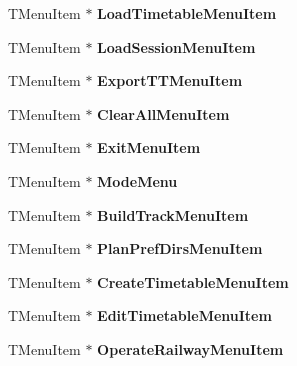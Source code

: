 \begin{DoxyCompactItemize}
T\+Menu\+Item $\ast$ {\bfseries Load\+Timetable\+Menu\+Item}
\item 
\mbox{\label{class_t_interface_aa62edd983f6ff1f2d0d68f48c6aaeda0}} 
T\+Menu\+Item $\ast$ {\bfseries Load\+Session\+Menu\+Item}
\item 
\mbox{\label{class_t_interface_a81b00a53a2e0591baf3589bb4c5b3793}} 
T\+Menu\+Item $\ast$ {\bfseries Export\+T\+T\+Menu\+Item}
\item 
\mbox{\label{class_t_interface_afd79ba734c2b134f0279b72d6606db22}} 
T\+Menu\+Item $\ast$ {\bfseries Clear\+All\+Menu\+Item}
\item 
\mbox{\label{class_t_interface_a9e147ffa9214458e6ea4838748da9a63}} 
T\+Menu\+Item $\ast$ {\bfseries Exit\+Menu\+Item}
\item 
\mbox{\label{class_t_interface_acd9d9b1f2e9f370f2e36d21dba083a61}} 
T\+Menu\+Item $\ast$ {\bfseries Mode\+Menu}
\item 
\mbox{\label{class_t_interface_a0eae9e0686e45636f0c41ad79bbdb728}} 
T\+Menu\+Item $\ast$ {\bfseries Build\+Track\+Menu\+Item}
\item 
\mbox{\label{class_t_interface_a82e2f2e9a73b05e43112c57a3d297886}} 
T\+Menu\+Item $\ast$ {\bfseries Plan\+Pref\+Dirs\+Menu\+Item}
\item 
\mbox{\label{class_t_interface_ae75664e06a36b87e941850337aa1bf30}} 
T\+Menu\+Item $\ast$ {\bfseries Create\+Timetable\+Menu\+Item}
\item 
\mbox{\label{class_t_interface_a1657e4071f56177d4152ea08bc814b16}} 
T\+Menu\+Item $\ast$ {\bfseries Edit\+Timetable\+Menu\+Item}
\item 
\mbox{\label{class_t_interface_ad47a6d3170286d961a53e6d26823ecbf}} 
T\+Menu\+Item $\ast$ {\bfseries Operate\+Railway\+Menu\+Item}
\item 
\mbox{\label{class_t_interface_ae68c6a19c4d5dee4c613011760d9f514}} 

\end{DoxyCompactItemize}
